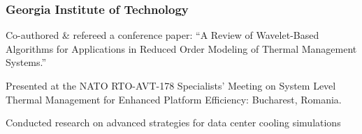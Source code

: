 
%
\subsubsection{Georgia Institute of Technology}
%
\begin{position}
  \begin{myitem}
  \item Co-authored \& refereed a conference paper: ``A Review of Wavelet-Based Algorithms for
    Applications in Reduced Order Modeling of Thermal Management Systems.''
  \item Presented at the NATO RTO-AVT-178 Specialists' Meeting on System Level Thermal Management
    for Enhanced Platform Efficiency: Bucharest, Romania.
  \item Conducted research on advanced strategies for data center cooling simulations
  \end{myitem}
\end{position}
